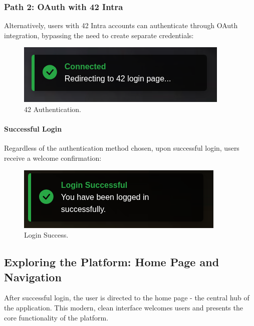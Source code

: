\subsubsection{Path 2: OAuth with 42 Intra} Alternatively, users with 42 Intra accounts can authenticate through OAuth integration, bypassing the need to create separate credentials:

\begin{figure}[H]
    \centering
    \includegraphics[width=0.6\linewidth]{Figures/images/new_images/42Login.png}
    \caption{42 Authentication.} %
    \label{fig:42-login}
\end{figure}

\paragraph{Successful Login} Regardless of the authentication method chosen, upon successful login, users receive a welcome confirmation:

\begin{figure}[H]
    \centering
    \includegraphics[width=0.6\linewidth]{Figures/images/new_images/LoginSuccessfully.png}
    \caption{Login Success.} %
    \label{fig:login-success-wireframe}
\end{figure}

\subsection{Exploring the Platform: Home Page and Navigation}

After successful login, the user is directed to the home page - the central hub of the application. This modern, clean interface welcomes users and presents the core functionality of the platform.

